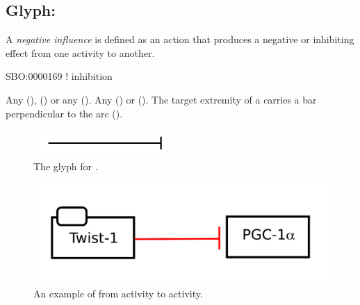 \subsection{Glyph: }
\label{sec:af:negative_infl}

A \emph{negative influence} is defined as an action that produces a negative or inhibiting effect from one activity to another.

\begin{glyphDescription}

\glyphSboTerm SBO:0000169 ! inhibition

 \glyphOrigin Any  (),   () or any  ().
 \glyphTarget Any  () or  ().
 \glyphEndPoint The target extremity of a  carries a bar perpendicular to the arc ().

\end{glyphDescription}

\begin{figure}[H]
  \centering
  \includegraphics[width = 2in]{images/negativeInfluence}
  \caption{The \AF glyph for .}
  \label{fig:af:negativeInfl}
\end{figure}

\begin{figure}[H]
  \centering
  \includegraphics[width = 5in]{examples/ex-negativeInfluence}
  \caption{An example of  from  activity to  activity.}
  \label{fig:af:ex-NI}
\end{figure} 